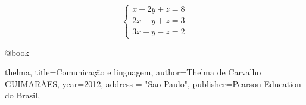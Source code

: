 
\begin{equation*}
     \begin{cases} 
        x+2y+z = 8\\ 
        2x-y+z=3\\ 
        3x+y-z=2 
    \end{cases}   
\end{equation*}


@book{thelma,
  title={Comunicação e linguagem},
  author={Thelma de Carvalho GUIMARÃES},
  year={2012},
  address = "Sao Paulo",
  publisher={Pearson Education do Brasil},
  
}
